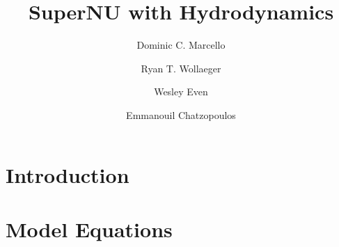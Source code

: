 \documentclass[preprint]{aastex62}
\begin{document}
\title{SuperNU with Hydrodynamics}


\author{Dominic C. Marcello}
\author{Ryan T. Wollaeger}
\author{Wesley Even}
\author{Emmanouil Chatzopoulos}
\begin{abstract}


\end{abstract}

\section{Introduction} \label{sec:intro}

\section{Model Equations} \label{sec:model}
\end{document}
